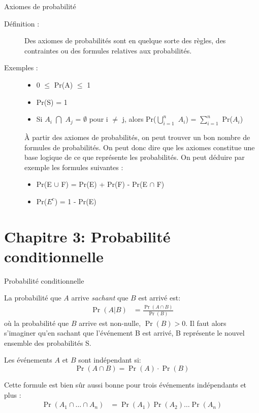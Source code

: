 \documentclass[10pt, french]{article}
\begin{document}
\begin{multicols*}{3}
\begin{axioms}{Axiomes de probabilité}
\begin{description}
  \item[Définition :] Des axiomes de probabilités sont en quelque sorte des règles, des contraintes ou des formules relatives aux probabilités.
  \item[Exemples :]
  \begin{itemize}
  \item 0 $\le$ Pr(A) $\le$ 1
  \item Pr(S) = 1
  \item Si $A_i$ $\bigcap$ $A_j$ = $\emptyset$ pour i $\neq$ j, alors Pr($\bigcup_{i = 1}^{n}$ $A_i$) = $\sum_{i = 1}^{n}$ Pr($A_i$)
  \end{itemize}
  À partir des axiomes de probabilités, on peut trouver un bon nombre de formules de probabilités. On peut donc dire que les axiomes constitue une base logique de ce que représente les probabilités. On peut déduire par exemple les formules suivantes :
  \begin{itemize}
  \item Pr(E $\cup$ F) = Pr(E) + Pr(F) - Pr(E $\cap$ F)
  \item Pr($E^{c}$) = 1 - Pr(E)
  \end{itemize}
\end{description}
\end{axioms}

\pagebreak
\section{Chapitre 3: Probabilité conditionnelle}
\begin{probch3}{Probabilité conditionnelle}
\begin{description}
	\item[Conditionnel:]	La probabilité que $A$ arrive \textit{sachant} que $B$ est arrivé est: 
	\begin{align*}
		\Pr(A | B) 
		&= 	\frac{\Pr(A \cap B)}{\Pr(B)}	
	\end{align*}
	où la probabilité que $B$ arrive est non-nulle, $\Pr(B) > 0$. Il faut alors s'imaginer qu'en sachant que l'événement B est arrivé, B représente le nouvel ensemble des probabilités S.
	\item[Indépendant:]	Les événements $A$ et $B$ sont indépendant si:
	\begin{equation*}
		\Pr(A \cap B) = \Pr(A) \cdot \Pr(B)
	\end{equation*}
	\item Cette formule est bien sûr aussi bonne pour trois événements indépendants et plus : 
	\setlength{\mathindent}{-1cm}
	\begin{align*}
	\Pr(A_{1} \cap \dots \cap A_{n}) 
	  &= \Pr(A_{1}) \Pr(A_{2}) \dots \Pr(A_{n})
	\end{align*}
\end{description}


\end{probch3}
\end{multicols*}
\end{document}
